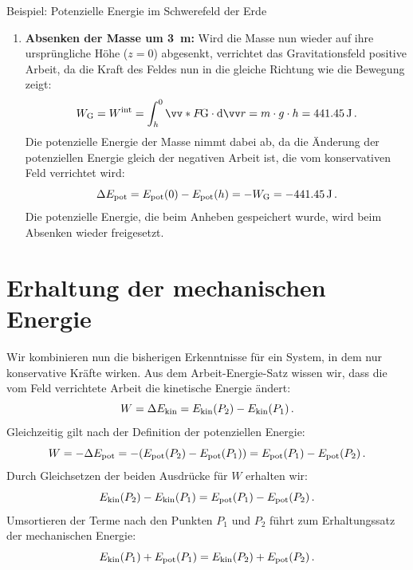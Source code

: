 \begin{examplebox}[breakable]{Beispiel: Potenzielle Energie im Schwerefeld der Erde}
\begin{enumerate}
        \item \textbf{Absenken der Masse um \SI{3}{\meter}:}
        Wird die Masse nun wieder auf ihre ursprüngliche Höhe ($z=0$) abgesenkt, verrichtet das Gravitationsfeld positive Arbeit, da die Kraft des Feldes nun in die gleiche Richtung wie die Bewegung zeigt:
        \begin{equation}
             W_\text{G} = W^{\text{int}} = \int_h^{0} \ivecS{F}{\text{G}} \cdot \dd \ivec{r} = m \cdot g \cdot h = \SI{441.45}{\joule} \mDot
        \end{equation}
        Die potenzielle Energie der Masse nimmt dabei ab, da die Änderung der potenziellen Energie gleich der negativen Arbeit ist, die vom konservativen Feld verrichtet wird:
         \begin{equation}
            \Delta E_{\text{pot}} = E_{\text{pot}}(0) - E_{\text{pot}}(h) = - W_\text{G} = \SI{-441.45}{\joule} \,.
        \end{equation}
        Die potenzielle Energie, die beim Anheben gespeichert wurde, wird beim Absenken wieder freigesetzt.
    \end{enumerate}
\end{examplebox}

\section{Erhaltung der mechanischen Energie}\label{sec: erhaltung_mechanische_energie}
Wir kombinieren nun die bisherigen Erkenntnisse für ein System, in dem nur konservative Kräfte wirken. Aus dem Arbeit-Energie-Satz wissen wir, dass die vom Feld verrichtete Arbeit die kinetische Energie ändert:
\begin{equation}
    W = \Delta E_{\text{kin}} = E_{\text{kin}}(P_2) - E_{\text{kin}}(P_1) \,.
\end{equation}
Gleichzeitig gilt nach der Definition der potenziellen Energie:
\begin{equation}
    W = -\Delta E_{\text{pot}} = -(E_{\text{pot}}(P_2) - E_{\text{pot}}(P_1)) = E_{\text{pot}}(P_1) - E_{\text{pot}}(P_2) \,.
\end{equation}
Durch Gleichsetzen der beiden Ausdrücke für $W$ erhalten wir: 
\begin{equation}
    E_{\text{kin}}(P_2) - E_{\text{kin}}(P_1) = E_{\text{pot}}(P_1) - E_{\text{pot}}(P_2) \,.
\end{equation}
Umsortieren der Terme nach den Punkten $P_1$ und $P_2$ führt zum Erhaltungssatz der mechanischen Energie:
\begin{equation}
    E_{\text{kin}}(P_1) + E_{\text{pot}}(P_1) = E_{\text{kin}}(P_2) + E_{\text{pot}}(P_2) \,.
\end{equation}

